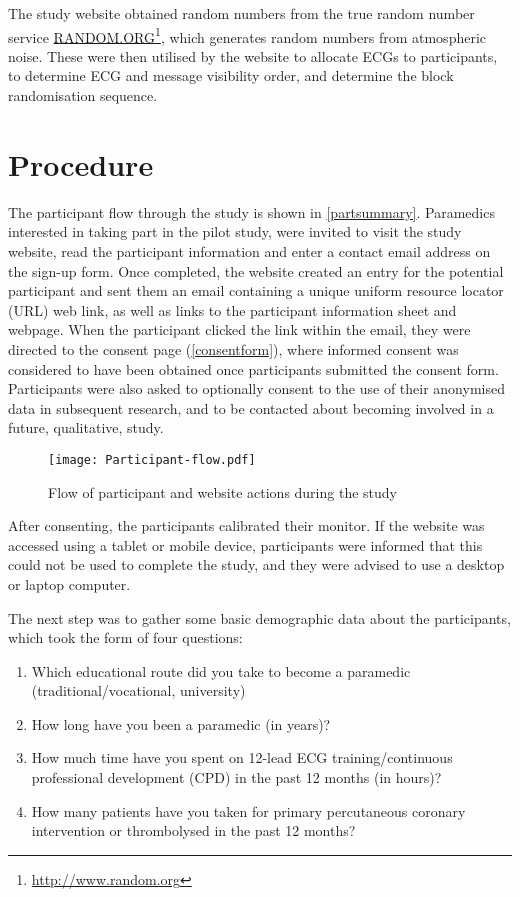The study website obtained random numbers from the true random number service \href{http://www.random.org}{RANDOM.ORG}\footnote{\href{http://www.random.org}{http:/\slash www.random.org}}, which generates random numbers from atmospheric noise. These were then utilised by the website to allocate ECGs to participants, to determine ECG and message visibility order, and determine the block randomisation sequence. 

\section{Procedure}
\label{procedure}

The participant flow through the study is shown in \autoref{partsummary}. Paramedics interested in taking part in the pilot study, were invited to visit the study website, read the participant information and enter a contact email address on the sign-up form. Once completed, the website created an entry for the potential participant and sent them an email containing a unique uniform resource locator (URL) web link, as well as links to the participant information sheet and webpage. When the participant clicked the link within the email, they were directed to the consent page (\autoref{consentform}), where informed consent was considered to have been obtained once participants submitted the consent form. Participants were also asked to optionally consent to the use of their anonymised data in subsequent research, and to be contacted about becoming involved in a future, qualitative, study.

\begin{figure}[htbp]
\centering
\texttt{[image: Participant-flow.pdf]}
\caption{Flow of participant and website actions during the study}
\label{partsummary}
\end{figure}



After consenting, the participants calibrated their monitor. If the website was accessed using a tablet or mobile device, participants were informed that this could not be used to complete the study, and they were advised to use a desktop or laptop computer. 

The next step was to gather some basic demographic data about the participants, which took the form of four questions:

\begin{enumerate}
\item Which educational route did you take to become a paramedic (traditional\slash vocational, university)

\item How long have you been a paramedic (in years)?

\item How much time have you spent on 12-lead ECG training\slash continuous professional development (CPD) in the past 12 months (in hours)?

\item How many patients have you taken for primary percutaneous coronary intervention or thrombolysed in the past 12 months?

\end{enumerate}

